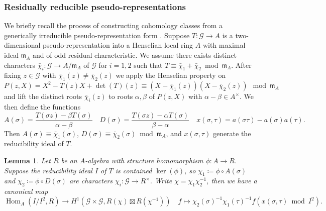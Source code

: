 \documentclass[leqno]{amsart}
\newtheorem{lem}[thm]{Lemma}
\theoremstyle{definition}
\theoremstyle{remark}
\DeclareMathOperator{\Hom}{Hom}
\newcommand{\fm}{\mathfrak{m}}
\begin{document}
\subsubsection{Residually reducible pseudo-representations}

We briefly recall the process of constructing
cohomology classes from a generically irreducible
pseudo-representation form \cite[\S 2.1]{urban}.
Suppose $T\colon \mathcal{G}\to A$
is a two-dimensional pseudo-representation
into a Henselian local ring $A$
with maximal ideal $\fm_A$
and of odd residual characteristic.
We assume there exists distinct characters
$\bar{\chi}_i\colon \mathcal{G}\to A/\fm_A$ of $\mathcal{G}$
for $i=1,2$ such that  
$T\equiv \bar{\chi}_1+\bar{\chi}_2\bmod \fm_A$.
After fixing $z\in \mathcal{G}$
with $\bar{\chi}_1(z)\neq \bar{\chi}_2(z)$
we apply the Henselian property on
\begin{equation*}
    P(z,X)=
    X^2-T(z)X+\det(T)(z) \equiv 
    (X-\bar{\chi}_1(z))(X-\bar{\chi}_2(z))
    \mod \fm_A
\end{equation*}
and lift the distinct roots $\bar{\chi}_i(z)$
to roots $\alpha,\beta$ of $P(z,X)$
with $\alpha-\beta\in A^\times$.
We then define the functions
\begin{equation}\label{eq:presentation}
   A(\sigma)=
   \frac{T(\sigma z)-\beta T(\sigma)}{\alpha-\beta}\quad
   D(\sigma)=
   \frac{T(\sigma z)-\alpha T(\sigma)}{\beta-\alpha}\quad
   x(\sigma,\tau)=a(\sigma\tau)-a(\sigma)a(\tau).
\end{equation}
Then 
$A(\sigma)\equiv \bar{\chi}_1(\sigma)$,
$D(\sigma)\equiv \bar{\chi}_2(\sigma)\bmod\fm_A$,
and $x(\sigma,\tau)$
generate the reducibility ideal of $T$.

\begin{lem}\cite[Lem 2.1.1]{urban}
Let $R$ be an $A$-algebra with structure 
homomorphism $\phi\colon A\to R$.
Suppose the reducibility ideal 
$I$ of $T$ is contained $\ker(\phi)$,
so $\chi_1\coloneqq \phi\circ A(\sigma)$
and $\chi_2\coloneqq \phi\circ D(\sigma)$
are characters $\chi_i\colon \mathcal{G}\to R^\times$.
Write $\chi=\chi_1\chi_2^{-1}$,
then we have a canonical map
\[
    \Hom_A(I/I^2, R)\to 
    H^1(\mathcal{G}\times\mathcal{G}, 
    R(\chi)\boxtimes R(\chi^{-1}))\quad
    f\mapsto \chi_2(\sigma)^{-1}\chi_1(\tau)^{-1}
    f(x(\sigma,\tau)\bmod I^2).
\]
\end{lem}
\end{document}
